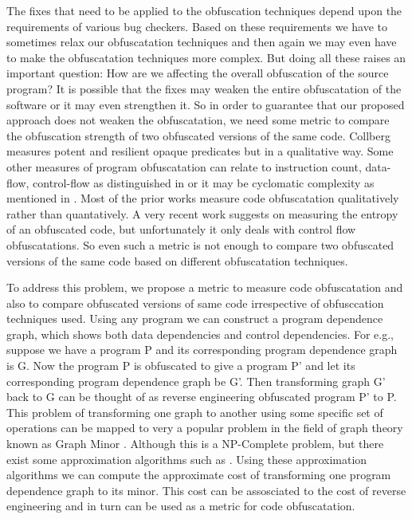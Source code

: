 The fixes that need to be applied to the obfuscation techniques depend upon the requirements of various bug checkers. Based on these requirements we have to sometimes relax our 
obfuscatation techniques and then again we may even have to make the obfuscatation techniques more complex. But doing all these raises an important question: How are we affecting the 
overall obfuscation of the source program? It is possible that the fixes may weaken the entire obfuscatation of the software or it may even strengthen it. So in order to guarantee that
 our proposed approach does not weaken the obfuscatation, we need some metric to compare the obfuscation strength of two obfuscated versions of the same code. Collberg \cite{collberg} 
measures potent and resilient opaque predicates but in a qualitative way. Some other measures of program obfuscatation can relate to instruction count, data-flow, control-flow as 
distinguished in \cite{sutter} or it may be cyclomatic complexity as mentioned in \cite{McCabe}. Most of the prior works measure code obfuscatation qualitatively rather than 
quantatively. A very recent work \cite{entropy} suggests on measuring the entropy of an obfuscated code, but unfortunately it only deals with control flow obfuscatations. So even such 
a metric is not enough to compare two obfuscated versions of the same code based on different obfuscatation techniques.

To address this problem, we propose a metric to measure code obfuscatation and also to compare obfuscated versions of same code irrespective of obfusccation techniques used. Using any 
program we can construct a program dependence graph, which shows both data dependencies and control dependencies. For e.g., suppose we have a program P and its corresponding program 
dependence graph is G. Now the program P is obfuscated to give a program P' and let its corresponding program dependence graph be G'. Then transforming graph G' back to G can be thought 
of as reverse engineering obfuscated program P' to P. This problem of transforming one graph to another using some specific set of operations can be mapped to very a popular problem in 
the field of graph theory known as Graph Minor \cite{graphminor}. Although this is a NP-Complete problem, but there exist some approximation algorithms such as \cite{Demaine05}. Using 
these approximation algorithms we can compute the approximate cost of transforming one program dependence graph to its minor. This cost can be assosciated to the cost of reverse 
engineering and in turn can be used as a metric for code obfuscatation.

